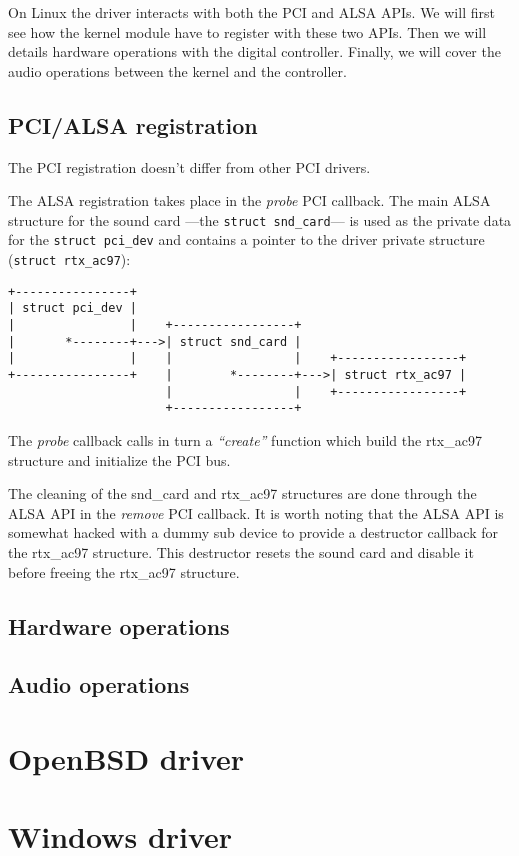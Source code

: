 \documentclass[a4paper,american]{rtxarticle}
\begin{document}
On Linux the driver interacts with both the PCI and ALSA\cite{ALSADriver,ALSAAPI}
APIs. We will first see how the kernel module have to register with these two
APIs. Then we will details hardware operations with the digital controller.
Finally, we will cover the audio operations between the kernel and the
controller.

\subsection{PCI/ALSA registration}

The PCI registration doesn't differ from other PCI drivers\cite[chap. 12]{LDD3}.

The ALSA registration takes place in the \emph{probe} PCI callback. The main
ALSA structure for the sound card ---the \texttt{struct snd\_card}--- is used as
the private data for the \texttt{struct pci\_dev} and contains a pointer to the
driver private structure (\texttt{struct rtx\_ac97}):
\begin{center}
\begin{verbatim}
+----------------+
| struct pci_dev |
|                |    +-----------------+
|       *--------+--->| struct snd_card |
|                |    |                 |    +-----------------+
+----------------+    |        *--------+--->| struct rtx_ac97 |
                      |                 |    +-----------------+
                      +-----------------+
\end{verbatim}
\end{center}

The \emph{probe} callback calls in turn a \emph{``create''} function which build
the rtx\_ac97 structure and initialize the PCI bus.

The cleaning of the snd\_card and rtx\_ac97 structures are done through the ALSA
API in the \emph{remove} PCI callback. It is worth noting that the ALSA API is
somewhat hacked with a dummy sub device to provide a destructor callback for the
rtx\_ac97 structure. This destructor resets the sound card and disable it before
freeing the rtx\_ac97 structure.

\subsection{Hardware operations}

\subsection{Audio operations}

\section{OpenBSD driver}

\section{Windows driver}

\newpage

\rtxmaketitleblock

\rtxbibliography
\end{document}
